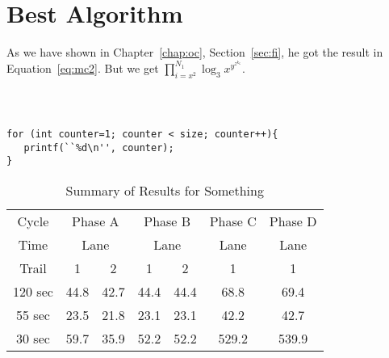 \chapter{Best Algorithm}

As we have shown in Chapter~\ref{chap:oc}, Section~\ref{sec:fi}, he got the result in Equation~\ref{eq:mc2}. But we get $\prod_{i=x^2}^{N_1}\log_3 x^{y^{z^{k_6}}}$.

{\tt
\begin{verbatim}

for (int counter=1; counter < size; counter++){
   printf(``%d\n'', counter);
}

\end{verbatim}
}

\begin{table}[htb]
	\caption{Summary of Results for Something}
	\label{tab:websterdelay-summarized}
	\centering
	\begin{tabular}{ccccccc}
		\toprule
		Cycle& \multicolumn{2}{c}{Phase A} & \multicolumn{2}{c}{Phase B} & Phase C & Phase D\\
		Time & \multicolumn{2}{c}{Lane} & \multicolumn{2}{c}{Lane} & Lane & Lane \\
		Trail &  1 &  2 &  1 &  2 &  1 &  1\\
		\midrule
		120 sec & 44.8 & 42.7 & 44.4 & 44.4 & 68.8 & 69.4\\
		55 sec & 23.5 & 21.8 & 23.1 & 23.1 & 42.2 & 42.7\\
		30 sec & 59.7 & 35.9 & 52.2 & 52.2 & 529.2 & 539.9\\
		\bottomrule
	\end{tabular}
\end{table}
